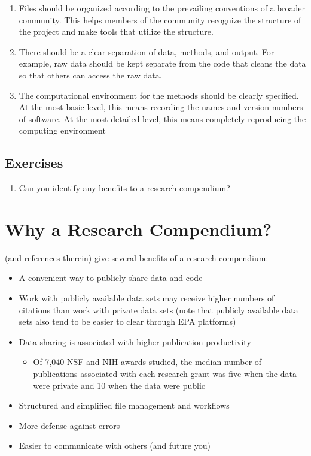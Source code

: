 \documentclass[
]{book}
\providecommand{\tightlist}{%
  \setlength{\itemsep}{0pt}\setlength{\parskip}{0pt}}
\begin{document}
\begin{enumerate}
\def\labelenumi{\arabic{enumi}.}
\item
  Files should be organized according to the prevailing conventions of a broader community. This helps members of the community recognize the structure of the project and make tools that utilize the structure.
\item
  There should be a clear separation of data, methods, and output. For example, raw data should be kept separate from the code that cleans the data so that others can access the raw data.
\item
  The computational environment for the methods should be clearly specified. At the most basic level, this means recording the names and version numbers of software. At the most detailed level, this means completely reproducing the computing environment
\end{enumerate}

\hypertarget{exercises-5}{%
\subsection{Exercises}\label{exercises-5}}

\begin{enumerate}
\def\labelenumi{\arabic{enumi}.}
\tightlist
\item
  Can you identify any benefits to a research compendium?
\end{enumerate}

\hypertarget{why-a-research-compendium}{%
\section{Why a Research Compendium?}\label{why-a-research-compendium}}

\citet{marwick2018packaging} (and references therein) give several benefits of a research compendium:

\begin{itemize}
\tightlist
\item
  A convenient way to publicly share data and code
\item
  Work with publicly available data sets may receive higher numbers of citations than work with private data sets (note that publicly available data sets also tend to be easier to clear through EPA platforms)
\item
  Data sharing is associated with higher publication productivity

  \begin{itemize}
  \tightlist
  \item
    Of 7,040 NSF and NIH awards studied, the median number of publications associated with each research grant was five when the data were private and 10 when the data were public
  \end{itemize}
\item
  Structured and simplified file management and workflows
\item
  More defense against errors
\item
  Easier to communicate with others (and future you)
\end{itemize}
\end{document}
